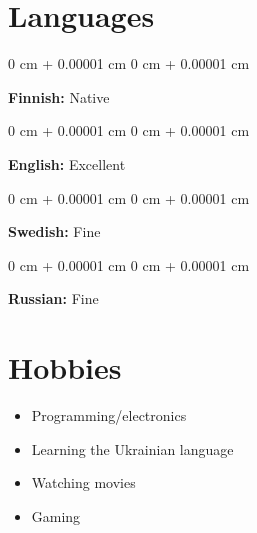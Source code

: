 \documentclass{article}
\newenvironment{highlights}{
    \begin{itemize}[
        topsep=0.10 cm,
        parsep=0.10 cm,
        partopsep=0pt,
        itemsep=0pt,
        leftmargin=0 cm + 10pt
    ]
}{
    \end{itemize}
}
\newenvironment{onecolentry}{
    \begin{adjustwidth}{
        0 cm + 0.00001 cm
    }{
        0 cm + 0.00001 cm
    }
}{
    \end{adjustwidth}
}
\begin{document}
  \section{Languages}
    \begin{onecolentry}
      \textbf{Finnish:} Native
    \end{onecolentry}
    \vspace{0.1 cm}
    \begin{onecolentry}
      \textbf{English:} Excellent
    \end{onecolentry}
    \vspace{0.1 cm}
    \begin{onecolentry}
      \textbf{Swedish:} Fine
    \end{onecolentry}
    \vspace{0.1 cm}
    \begin{onecolentry}
      \textbf{Russian:} Fine
    \end{onecolentry}
    \vspace{0.1 cm}
  \section{Hobbies}
    \begin{highlights}
      \item Programming/electronics
      \item Learning the Ukrainian language
      \item Watching movies
      \item Gaming
    \end{highlights}
\end{document}
